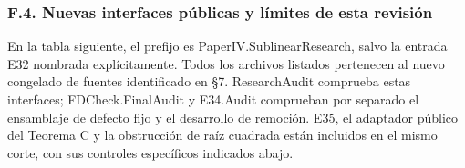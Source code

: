 \documentclass[spanish,11pt,a4paper]{article}
\begin{document}
\subsubsection{F.4. Nuevas interfaces públicas y límites de esta revisión}\label{f.4.-nuevas-interfaces-publicas-y-limites-de-esta-revision}

En la tabla siguiente, el prefijo es {\ttfamily\small PaperIV.\discretionary{\hbox{\ensuremath{\hookrightarrow}}}{}{}SublinearRes\discretionary{\hbox{\ensuremath{\hookrightarrow}}}{}{}earch}, salvo la entrada E32 nombrada explícitamente. Todos los archivos listados pertenecen al nuevo congelado de fuentes identificado en §7. ResearchAudit comprueba estas interfaces; FDCheck.FinalAudit y E34.Audit comprueban por separado el ensamblaje de defecto fijo y el desarrollo de remoción. E35, el adaptador público del Teorema C y la obstrucción de raíz cuadrada están incluidos en el mismo corte, con sus controles específicos indicados abajo.
\end{document}
